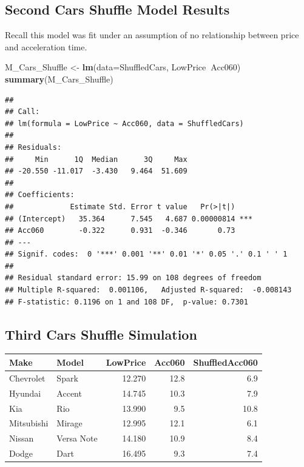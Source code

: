 \documentclass[]{book}
\newenvironment{Shaded}{\begin{snugshade}}{\end{snugshade}}
\newcommand{\KeywordTok}[1]{\textcolor[rgb]{0.13,0.29,0.53}{\textbf{#1}}}
\newcommand{\DataTypeTok}[1]{\textcolor[rgb]{0.13,0.29,0.53}{#1}}
\newcommand{\DecValTok}[1]{\textcolor[rgb]{0.00,0.00,0.81}{#1}}
\newcommand{\StringTok}[1]{\textcolor[rgb]{0.31,0.60,0.02}{#1}}
\newcommand{\OperatorTok}[1]{\textcolor[rgb]{0.81,0.36,0.00}{\textbf{#1}}}
\newcommand{\NormalTok}[1]{#1}
\begin{document}
\subsection{Second Cars Shuffle Model
Results}\label{second-cars-shuffle-model-results}

Recall this model was fit under an assumption of no relationship between
price and acceleration time.

\begin{Shaded}
\begin{Highlighting}[]
\NormalTok{M_Cars_Shuffle <-}\StringTok{ }\KeywordTok{lm}\NormalTok{(}\DataTypeTok{data=}\NormalTok{ShuffledCars, LowPrice}\OperatorTok{~}\NormalTok{Acc060)}
\KeywordTok{summary}\NormalTok{(M_Cars_Shuffle)}
\end{Highlighting}
\end{Shaded}

\begin{verbatim}
## 
## Call:
## lm(formula = LowPrice ~ Acc060, data = ShuffledCars)
## 
## Residuals:
##     Min      1Q  Median      3Q     Max 
## -20.550 -11.017  -3.430   9.464  51.609 
## 
## Coefficients:
##             Estimate Std. Error t value   Pr(>|t|)    
## (Intercept)   35.364      7.545   4.687 0.00000814 ***
## Acc060        -0.322      0.931  -0.346       0.73    
## ---
## Signif. codes:  0 '***' 0.001 '**' 0.01 '*' 0.05 '.' 0.1 ' ' 1
## 
## Residual standard error: 15.99 on 108 degrees of freedom
## Multiple R-squared:  0.001106,   Adjusted R-squared:  -0.008143 
## F-statistic: 0.1196 on 1 and 108 DF,  p-value: 0.7301
\end{verbatim}

\subsection{Third Cars Shuffle
Simulation}\label{third-cars-shuffle-simulation}

\begin{Shaded}
\end{Shaded}

\begin{tabular}{l|l|r|r|r}
\hline
Make & Model & LowPrice & Acc060 & ShuffledAcc060\\
\hline
Chevrolet & Spark & 12.270 & 12.8 & 6.9\\
\hline
Hyundai & Accent & 14.745 & 10.3 & 7.9\\
\hline
Kia & Rio & 13.990 & 9.5 & 10.8\\
\hline
Mitsubishi & Mirage & 12.995 & 12.1 & 6.1\\
\hline
Nissan & Versa Note & 14.180 & 10.9 & 8.4\\
\hline
Dodge & Dart & 16.495 & 9.3 & 7.4\\
\hline
\end{tabular}
\end{document}
